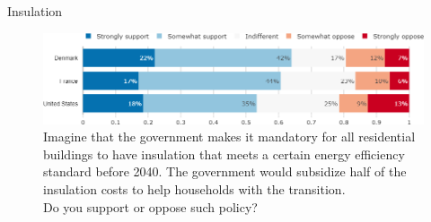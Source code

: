 \documentclass[aspectratio=169,9pt,dvipsnames]{beamer}
\begin{document}

\begin{frame}{Insulation}%
\vspace{-.5cm}
\begin{figure}[h!]
\caption{Imagine that the  government makes it mandatory for all residential buildings to have insulation that meets a certain energy efficiency standard before 2040. The government would subsidize half of the insulation costs to help households with the transition. \\
Do you support or oppose such policy? }
\includegraphics[width=.9\textwidth]{../figures/country_comparison/insulation_support_countries.png} 
\end{figure}
\end{frame}
\end{document}
